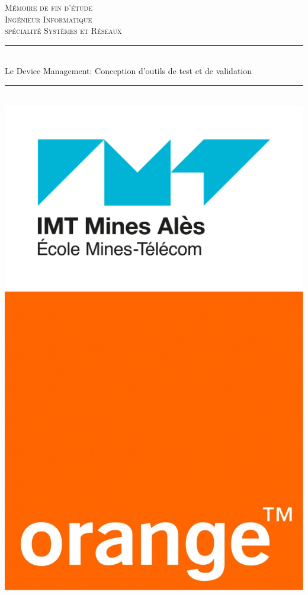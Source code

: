 \documentclass[12pt,a4paper]{report}
\newcommand{\HRule}{\rule{\linewidth}{0.5mm}}
\begin{document}
\begin{titlepage}
  \begin{center}

    \textsc{\LARGE Mémoire de fin d'étude}\\[2cm]

    \textsc{\Large Ingénieur Informatique\\ spécialité Systèmes et Réseaux}\\[1.5cm]

    \HRule \\[0.4cm]
    { \huge Le Device Management: Conception d'outils de test et de validation\\[0.4cm] }

    \HRule \\[2cm]
    \includegraphics[scale=0.2]{./img/imt_mines_ales-bleu.jpg}
    \includegraphics[scale=0.1]{./img/orange.jpg}
    \\[2cm]


\end{center}
\end{titlepage}
\end{document}
